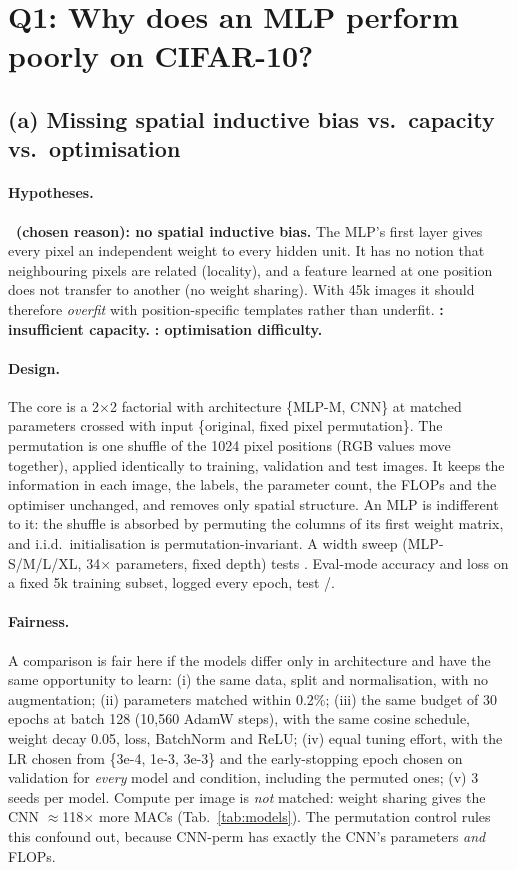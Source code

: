\section{Q1: Why does an MLP perform poorly on CIFAR-10?}
\label{sec:q1}

\subsection{(a) Missing spatial inductive bias vs.\ capacity vs.\ optimisation}

\paragraph{Hypotheses.} \textbf{\Hone\ (chosen reason): no spatial inductive bias.} The MLP's first layer gives every pixel
an independent weight to every hidden unit. It has no notion that neighbouring pixels are related (locality), and a
feature learned at one position does not transfer to another (no weight sharing). With 45k images it should therefore
\emph{overfit} with position-specific templates rather than underfit. \textbf{\Htwo: insufficient capacity.}
\textbf{\Hthree: optimisation difficulty.}

\paragraph{Design.} The core is a 2$\times$2 factorial with architecture \{MLP-M, CNN\} at matched parameters crossed with
input \{original, fixed pixel permutation\}. The permutation is one shuffle of the 1024 pixel positions (RGB values move
together), applied identically to training, validation and test images. It keeps the information in each image, the
labels, the parameter count, the FLOPs and the optimiser unchanged, and removes only spatial structure. An MLP is
indifferent to it: the shuffle is absorbed by permuting the columns of its first weight matrix, and i.i.d.\ initialisation
is permutation-invariant. A width sweep (MLP-S/M/L/XL, 34$\times$ parameters, fixed depth) tests \Htwo. Eval-mode
accuracy and loss on a fixed 5k training subset, logged every epoch, test \Htwo/\Hthree.

\paragraph{Fairness.} A comparison is fair here if the models differ only in architecture and have the same opportunity
to learn: (i) the same data, split and normalisation, with no augmentation; (ii) parameters matched within 0.2\%;
(iii) the same budget of 30 epochs at batch 128 (10,560 AdamW steps), with the same cosine schedule, weight decay 0.05, loss,
BatchNorm and ReLU; (iv) equal tuning effort, with the LR chosen from \{3e-4, 1e-3, 3e-3\} and the early-stopping epoch
chosen on validation for \emph{every} model and condition, including the permuted ones; (v) 3 seeds per model.
Compute per image is \emph{not} matched: weight sharing gives the CNN $\approx$118$\times$ more MACs
(Tab.~\ref{tab:models}). The permutation control rules this confound out, because CNN-perm has exactly the CNN's
parameters \emph{and} FLOPs.

